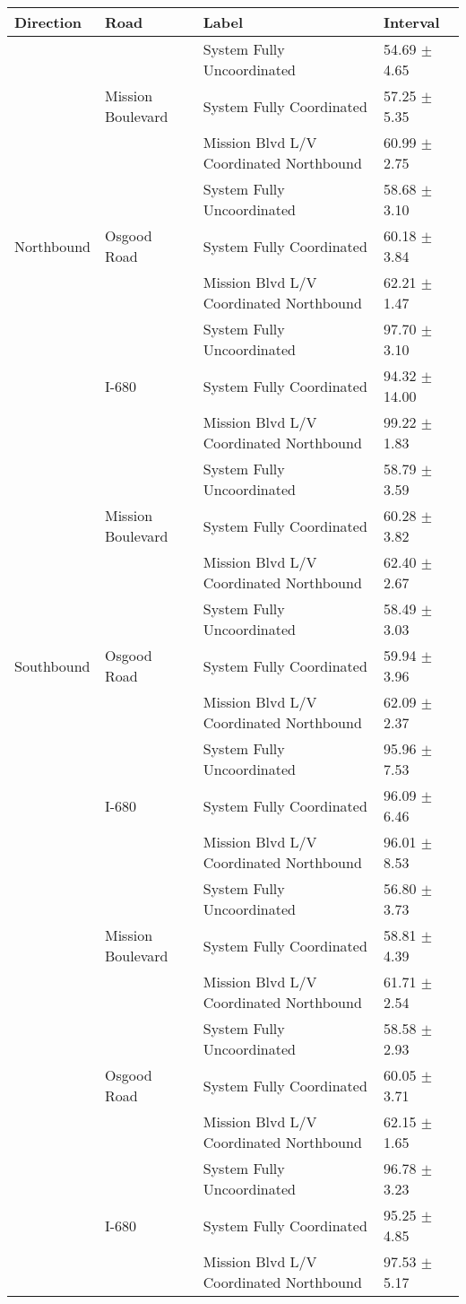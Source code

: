 \begin{tabular}{llll}
\toprule
Direction & Road & Label & Interval \\
\midrule
\multirow[t]{9}{*}{Northbound} & \multirow[t]{3}{*}{Mission Boulevard} & System Fully Uncoordinated & 54.69 $\pm$ 4.65 \\
 &  & System Fully Coordinated & 57.25 $\pm$ 5.35 \\
 &  & Mission Blvd L/V Coordinated Northbound & 60.99 $\pm$ 2.75 \\
 & \multirow[t]{3}{*}{Osgood Road} & System Fully Uncoordinated & 58.68 $\pm$ 3.10 \\
 &  & System Fully Coordinated & 60.18 $\pm$ 3.84 \\
 &  & Mission Blvd L/V Coordinated Northbound & 62.21 $\pm$ 1.47 \\
 & \multirow[t]{3}{*}{I-680} & System Fully Uncoordinated & 97.70 $\pm$ 3.10 \\
 &  & System Fully Coordinated & 94.32 $\pm$ 14.00 \\
 &  & Mission Blvd L/V Coordinated Northbound & 99.22 $\pm$ 1.83 \\
\multirow[t]{9}{*}{Southbound} & \multirow[t]{3}{*}{Mission Boulevard} & System Fully Uncoordinated & 58.79 $\pm$ 3.59 \\
 &  & System Fully Coordinated & 60.28 $\pm$ 3.82 \\
 &  & Mission Blvd L/V Coordinated Northbound & 62.40 $\pm$ 2.67 \\
 & \multirow[t]{3}{*}{Osgood Road} & System Fully Uncoordinated & 58.49 $\pm$ 3.03 \\
 &  & System Fully Coordinated & 59.94 $\pm$ 3.96 \\
 &  & Mission Blvd L/V Coordinated Northbound & 62.09 $\pm$ 2.37 \\
 & \multirow[t]{3}{*}{I-680} & System Fully Uncoordinated & 95.96 $\pm$ 7.53 \\
 &  & System Fully Coordinated & 96.09 $\pm$ 6.46 \\
 &  & Mission Blvd L/V Coordinated Northbound & 96.01 $\pm$ 8.53 \\
\multirow[t]{9}{*}{} & \multirow[t]{3}{*}{Mission Boulevard} & System Fully Uncoordinated & 56.80 $\pm$ 3.73 \\
 &  & System Fully Coordinated & 58.81 $\pm$ 4.39 \\
 &  & Mission Blvd L/V Coordinated Northbound & 61.71 $\pm$ 2.54 \\
 & \multirow[t]{3}{*}{Osgood Road} & System Fully Uncoordinated & 58.58 $\pm$ 2.93 \\
 &  & System Fully Coordinated & 60.05 $\pm$ 3.71 \\
 &  & Mission Blvd L/V Coordinated Northbound & 62.15 $\pm$ 1.65 \\
 & \multirow[t]{3}{*}{I-680} & System Fully Uncoordinated & 96.78 $\pm$ 3.23 \\
 &  & System Fully Coordinated & 95.25 $\pm$ 4.85 \\
 &  & Mission Blvd L/V Coordinated Northbound & 97.53 $\pm$ 5.17 \\
\bottomrule
\end{tabular}
